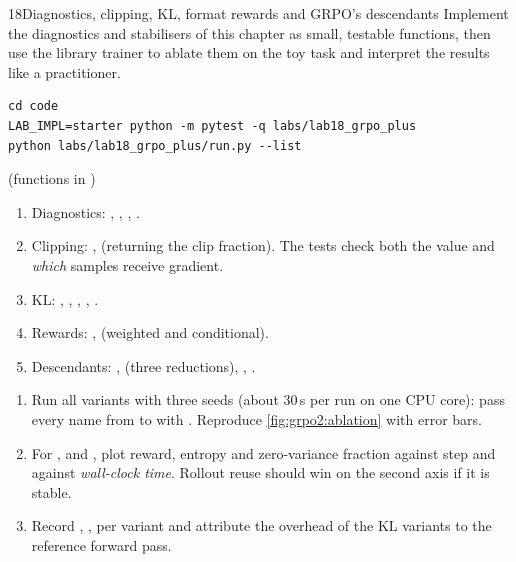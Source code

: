 \begin{labbox}{18}{Diagnostics, clipping, KL, format rewards and GRPO's descendants}
Implement the diagnostics and stabilisers of this chapter as small, testable functions, then
use the library trainer to ablate them on the toy task and interpret the results like a
practitioner.

\begin{lstlisting}[style=shell]
cd code
LAB_IMPL=starter python -m pytest -q labs/lab18_grpo_plus
python labs/lab18_grpo_plus/run.py --list
\end{lstlisting}

 (functions in )
\begin{enumerate}
\item Diagnostics: , ,
, .
\item Clipping: ,  (returning the clip
fraction). The tests check both the value and \emph{which} samples receive gradient.
\item KL: , , , ,
.
\item Rewards: ,  (weighted and conditional).
\item Descendants: ,  (three
reductions), , .
\end{enumerate}

\begin{enumerate}
\item Run all variants with three seeds (about 30\,s per run on one CPU core):
pass every name from  to  with . Reproduce \cref{fig:grpo2:ablation} with
error bars.
\item For ,  and , plot reward, entropy
and zero-variance fraction against step and against \emph{wall-clock time}. Rollout reuse
should win on the second axis if it is stable.
\item Record , ,  per variant and attribute
the overhead of the KL variants to the reference forward pass.
\end{enumerate}


\end{labbox}
